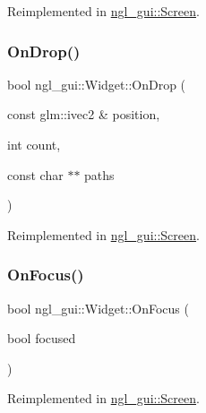 Reimplemented in \mbox{\hyperlink{classngl__gui_1_1_screen_a1a74a47ad88de9f75cc87c053eb7d00e}{ngl\+\_\+gui\+::\+Screen}}.

\mbox{\label{classngl__gui_1_1_widget_a244384eb10f734be4bbd90b440817592}} 
\subsubsection{\texorpdfstring{On\+Drop()}{OnDrop()}}
{\footnotesize\ttfamily bool ngl\+\_\+gui\+::\+Widget\+::\+On\+Drop (\begin{DoxyParamCaption}\item[{const glm\+::ivec2 \&}]{position,  }\item[{int}]{count,  }\item[{const char $\ast$$\ast$}]{paths }\end{DoxyParamCaption})\hspace{0.3cm}{\ttfamily [virtual]}}



Reimplemented in \mbox{\hyperlink{classngl__gui_1_1_screen_a72094220b06b22f1a301295ce4bcfed6}{ngl\+\_\+gui\+::\+Screen}}.

\mbox{\label{classngl__gui_1_1_widget_a3ea889d10cb2e1d0241dabbefdce5dc7}} 
\subsubsection{\texorpdfstring{On\+Focus()}{OnFocus()}}
{\footnotesize\ttfamily bool ngl\+\_\+gui\+::\+Widget\+::\+On\+Focus (\begin{DoxyParamCaption}\item[{bool}]{focused }\end{DoxyParamCaption})\hspace{0.3cm}{\ttfamily [virtual]}}



Reimplemented in \mbox{\hyperlink{classngl__gui_1_1_screen_adaf24551542f162fa02e79ad7f4c9b8d}{ngl\+\_\+gui\+::\+Screen}}.

\mbox{\label{classngl__gui_1_1_widget_a5e2315b912f87414def29b4bdbba9205}} 
